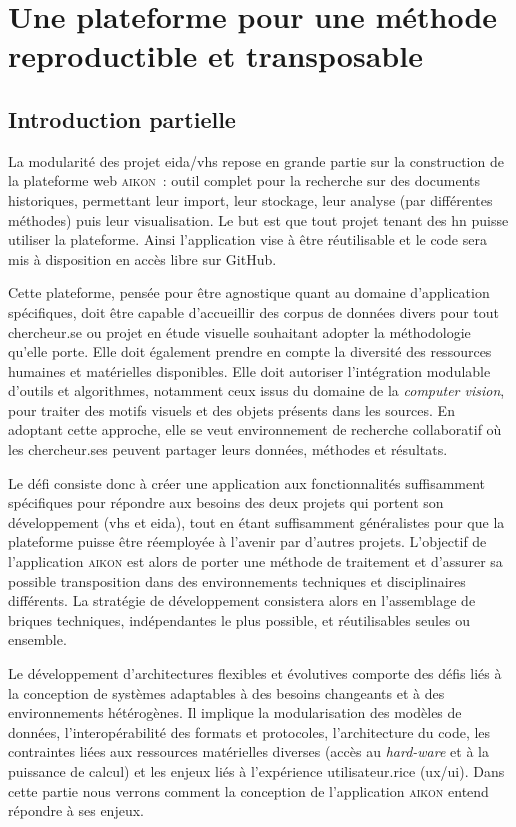 \documentclass[a4paper,12pt,twoside]{book}
\newcommand{\eida}{\gls{eida}\xspace}
\newcommand{\aikon}{\textsc{aikon}\xspace}
\newcommand{\cv}{\emph{computer vision}\xspace}
\newcommand{\vhs}{\gls{vhs}\xspace}
\newcommand{\hn}{\gls{hn}\xspace}
\newcommand{\ux}{\gls{ux}\xspace}
\newcommand{\ui}{\gls{ui}\xspace}
\begin{document}
    \part{Une plateforme pour une méthode reproductible et transposable}

\chapter*{Introduction partielle}

La modularité des projet \eida/\vhs repose en grande partie sur la
construction de la plateforme web \aikon~: outil complet pour la
recherche sur des documents historiques, permettant leur import,
leur stockage, leur analyse (par différentes méthodes) puis leur visualisation. Le but
est que tout projet tenant des \hn puisse utiliser la plateforme. Ainsi
l'application vise à être réutilisable et le code sera mis à disposition
en accès libre sur GitHub.

Cette plateforme, pensée pour être agnostique quant au domaine
d'application spécifiques, doit être capable d'accueillir des corpus de
données divers pour tout chercheur.se ou projet en étude visuelle
souhaitant adopter la méthodologie qu'elle porte. Elle doit également
prendre en compte la diversité des ressources humaines et matérielles
disponibles. Elle doit autoriser l'intégration modulable d'outils et algorithmes, notamment
ceux issus du domaine de la \cv, pour traiter des motifs
visuels et des objets présents dans les sources. En adoptant cette
approche, elle se veut environnement de recherche collaboratif où les
chercheur.ses peuvent partager leurs données, méthodes et résultats.

Le défi consiste donc à créer une application aux fonctionnalités
suﬀisamment spécifiques pour répondre aux besoins des deux projets qui
portent son développement (\vhs et \eida), tout en étant suﬀisamment
généralistes pour que la plateforme puisse être réemployée à l'avenir
par d'autres projets. L'objectif de l'application \aikon est alors de porter une
méthode de traitement et d'assurer sa possible transposition dans des
environnements techniques et disciplinaires différents. La stratégie de
développement consistera alors en l'assemblage de briques techniques,
indépendantes le plus possible, et réutilisables seules ou ensemble.

Le développement d'architectures flexibles et évolutives comporte des
défis liés à la conception de systèmes adaptables à des
besoins changeants et à des environnements hétérogènes. Il implique la
modularisation des modèles de données, l'interopérabilité des formats et
protocoles, l'architecture du code, les contraintes liées aux
ressources matérielles diverses (accès au \textit{hard-ware} et à la puissance de
calcul) et les enjeux liés à l'expérience utilisateur.rice (\ux/\ui).
Dans cette partie nous verrons comment la conception de l'application
\aikon entend répondre à ses enjeux.
\end{document}
